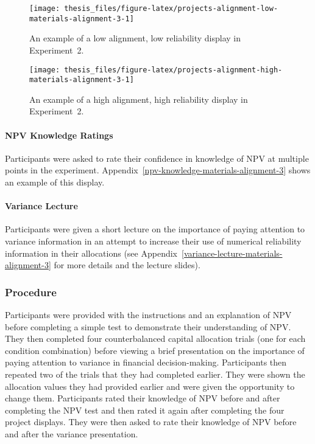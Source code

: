 \documentclass[a4paper, nobind]{templates/ociamthesis}
\theoremstyle{definition}
\theoremstyle{definition}
\theoremstyle{definition}
\theoremstyle{definition}
\theoremstyle{remark}
\begin{document}
\begin{figure}
\texttt{[image: thesis\_files/figure-latex/projects-alignment-low-materials-alignment-3-1]} \caption{An example of a low alignment, low reliability display in Experiment~2.}\label{fig:projects-alignment-low-materials-alignment-3}
\end{figure}



\begin{figure}
\texttt{[image: thesis\_files/figure-latex/projects-alignment-high-materials-alignment-3-1]} \caption{An example of a high alignment, high reliability display in Experiment~2.}\label{fig:projects-alignment-high-materials-alignment-3}
\end{figure}

\paragraph{NPV Knowledge Ratings}

Participants were asked to rate their confidence in knowledge of NPV at multiple
points in the experiment. Appendix~\ref{npv-knowledge-materials-alignment-3}
shows an example of this display.

\paragraph{Variance Lecture}

Participants were given a short lecture on the importance of paying attention to
variance information in an attempt to increase their use of numerical
reliability information in their allocations (see
Appendix~\ref{variance-lecture-materials-alignment-3} for more details and the
lecture slides).

\hypertarget{procedure-alignment-3}{%
\subsubsection{Procedure}\label{procedure-alignment-3}}

Participants were provided with the instructions and an explanation of NPV
before completing a simple test to demonstrate their understanding of NPV. They
then completed four counterbalanced capital allocation trials (one for each
condition combination) before viewing a brief presentation on the importance of
paying attention to variance in financial decision-making. Participants then
repeated two of the trials that they had completed earlier. They were shown the
allocation values they had provided earlier and were given the opportunity to
change them. Participants rated their knowledge of NPV before and after
completing the NPV test and then rated it again after completing the four
project displays. They were then asked to rate their knowledge of NPV before and
after the variance presentation.
\end{document}

